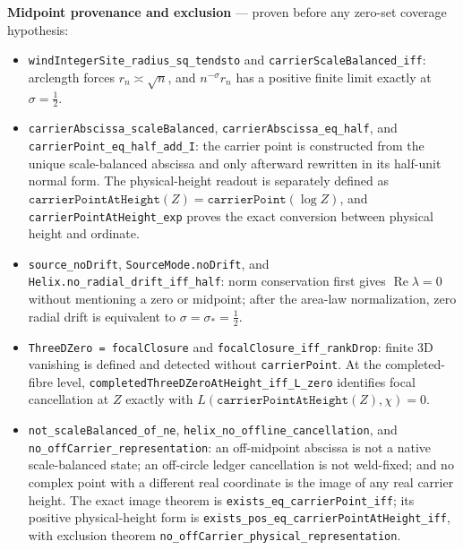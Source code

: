 \documentclass[11pt]{article}
\theoremstyle{definition}
\renewcommand{\Re}{\operatorname{Re}}
\begin{document}
\medskip
\noindent\textbf{Midpoint provenance and exclusion} --- proven before any
zero-set coverage hypothesis:
\begin{itemize}
\item \texttt{windIntegerSite\_radius\_sq\_tendsto} and
\texttt{carrierScaleBalanced\_iff}: arclength forces
\(r_n\asymp\sqrt n\), and \(n^{-\sigma}r_n\) has a positive finite limit
exactly at \(\sigma=\tfrac12\).
\item \texttt{carrierAbscissa\_scaleBalanced},
\texttt{carrierAbscissa\_eq\_half}, and
\texttt{carrierPoint\_eq\_half\_add\_I}: the carrier point is constructed
from the unique scale-balanced abscissa and only afterward rewritten in its
half-unit normal form.  The physical-height readout is separately defined as
\(\texttt{carrierPointAtHeight}(Z)=\texttt{carrierPoint}(\log Z)\), and
\texttt{carrierPointAtHeight\_exp} proves the exact conversion between
physical height and ordinate.
\item \texttt{source\_noDrift}, \texttt{SourceMode.noDrift}, and
\texttt{Helix.no\_radial\_drift\_iff\_half}: norm conservation first gives
\(\Re\lambda=0\) without mentioning a zero or midpoint; after the area-law
normalization, zero radial drift is equivalent to
\(\sigma=\sigma_*=\tfrac12\).
\item \texttt{ThreeDZero = focalClosure} and
\texttt{focalClosure\_iff\_rankDrop}: finite 3D vanishing is defined and
detected without \texttt{carrierPoint}.  At the completed-fibre level,
\texttt{completedThreeDZeroAtHeight\_iff\_L\_zero} identifies focal
cancellation at \(Z\) exactly with
\(L(\texttt{carrierPointAtHeight}(Z),\chi)=0\).
\item \texttt{not\_scaleBalanced\_of\_ne},
\texttt{helix\_no\_offline\_cancellation}, and
\texttt{no\_offCarrier\_representation}: an off-midpoint abscissa is
not a native scale-balanced state; an off-circle ledger cancellation is not
weld-fixed; and no complex point with a different real coordinate is the
image of any real carrier height.  The exact image theorem is
\texttt{exists\_eq\_carrierPoint\_iff}; its positive physical-height form is
\texttt{exists\_pos\_eq\_carrierPointAtHeight\_iff}, with exclusion theorem
\texttt{no\_offCarrier\_physical\_representation}.
\end{itemize}
\end{document}
